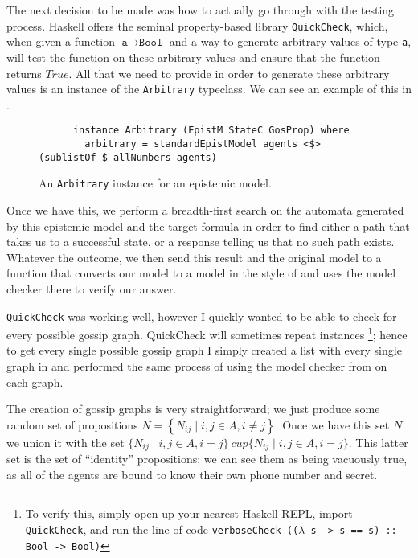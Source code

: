 \documentclass[12pt, a4paper]{article}
\begin{document}
The next decision to be made was how to actually go through with the testing
process. Haskell offers the seminal property-based library \texttt{QuickCheck},
which, when given a function $\texttt{a} \rightarrow \texttt{Bool}$ and a way to
generate arbitrary values of type \texttt{a}, will test the function on these
arbitrary values and ensure that the function returns $True$. All that we need
to provide in order to generate these arbitrary values is an instance of the
\texttt{Arbitrary} typeclass. We can see an example of this in .

\begin{figure}[h]
  \centering
  \begin{verbatim}
      instance Arbitrary (EpistM StateC GosProp) where
        arbitrary = standardEpistModel agents <$> (sublistOf $ allNumbers agents)
  \end{verbatim}
  \caption{An \texttt{Arbitrary} instance for an epistemic model.}
  \label{fig:Arbitrary}
\end{figure}

Once we have this, we perform a breadth-first search on the automata generated
by this epistemic model and the target formula in order to find either a path
that takes us to a successful state, or a response telling us that no such path
exists. Whatever the outcome, we then send this result and the original model to
a function that converts our model to a model in the style of
\cite{GithubGossip} and uses the model checker there to verify our answer.

\bigskip

\texttt{QuickCheck} was working well, however I quickly wanted to be able to
check for every possible gossip graph. QuickCheck will sometimes repeat
instances \footnote{To verify this, simply open up your nearest Haskell REPL,
  import \texttt{QuickCheck}, and run the line of code \texttt{verboseCheck
    (($\lambda$ s -> s == s) :: Bool -> Bool)}}; hence to get every single
possible gossip graph I simply created a list with every single graph in and
performed the same process of using the model checker from \cite{GithubGossip}
on each graph.

\bigskip

The creation of gossip graphs is very straightforward; we just produce some
random set of propositions $N = \left\{ N_{ij} \mid i, j \in A, i \not = j
\right\}$. Once we have this set $N$ we union it with the set $\{N_{ij} \mid i,
j \in A, i = j\}\ cup \{N_{ij} \mid i, j \in A, i = j\}$. This latter set is the
set of ``identity'' propositions; we can see them as being vacuously true, as
all of the agents are bound to know their own phone number and secret.
\end{document}
